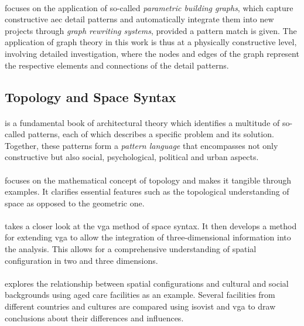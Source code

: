 \documentclass[a4paper, 12pt]{report}
\begin{document}
\paragraph{\cite{abualdenien2021pbg}} focuses on the application of so-called \textit{parametric building graphs}, which capture constructive \acrshort{aec} detail patterns and automatically integrate them into new projects through \textit{graph rewriting systems}, provided a pattern match is given. The application of graph theory in this work is thus at a physically constructive level, involving detailed investigation, where the nodes and edges of the graph represent the respective elements and connections of the detail patterns.

\subsection*{Topology and Space Syntax}\label{subsec:topology-in-architecture-fr}

\paragraph{\cite{alexander1977pattern}} is a fundamental book of architectural theory which identifies a multitude of so-called patterns, each of which describes a specific problem and its solution. Together, these patterns form a \textit{pattern language} that encompasses not only constructive but also social, psychological, political and urban aspects.

\paragraph{\cite{kantor2005tale}} focuses on the mathematical concept of topology and makes it tangible through examples. It clarifies essential features such as the topological understanding of space as opposed to the geometric one.

\paragraph{\cite{varoudis2014beyond}} takes a closer look at the \acrfull{vga} method of space syntax. It then develops a method for extending \acrshort{vga} to allow the integration of three-dimensional information into the analysis. This allows for a comprehensive understanding of spatial configuration in two and three dimensions.

\paragraph{\cite{lee2017measuring}} explores the relationship between spatial configurations and cultural and social backgrounds using aged care facilities as an example. Several facilities from different countries and cultures are compared using \gls{isovist} and \acrlong{vga} to draw conclusions about their differences and influences.
\end{document}
